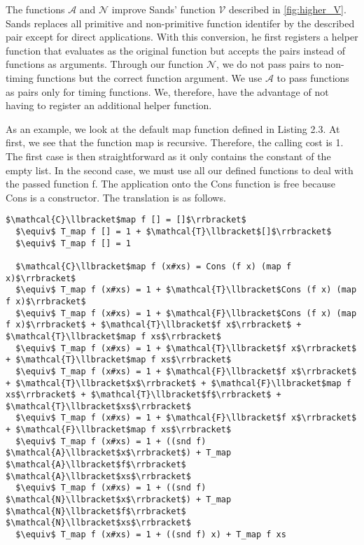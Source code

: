 The functions $\mathcal{A}$ and $\mathcal{N}$ improve Sands' function $\mathcal{V}$ described in \autoref{fig:higher_V}.
Sands replaces all primitive and non-primitive function identifer by the described pair except for direct applications.
With this conversion, he first registers a helper function that evaluates as the original function but accepts the pairs instead of functions as arguments.
Through our function $\mathcal{N}$, we do not pass pairs to non-timing functions but the correct function argument.
We use $\mathcal{A}$ to pass functions as pairs only for timing functions.
We, therefore, have the advantage of not having to register an additional helper function.

As an example, we look at the default map function defined in Listing 2.3. At first, we see that the function map is recursive.
Therefore, the calling cost is 1.
The first case is then straightforward as it only contains the constant of the empty list.
In the second case, we must use all our defined functions to deal with the passed function f.
The application onto the Cons function is free because Cons is a constructor.
The translation is as follows.
\begin{lstlisting}[mathescape=true,language=translation]
  $\mathcal{C}\llbracket$map f [] = []$\rrbracket$
  $\equiv$ T_map f [] = 1 + $\mathcal{T}\llbracket$[]$\rrbracket$
  $\equiv$ T_map f [] = 1

  $\mathcal{C}\llbracket$map f (x#xs) = Cons (f x) (map f x)$\rrbracket$
  $\equiv$ T_map f (x#xs) = 1 + $\mathcal{T}\llbracket$Cons (f x) (map f x)$\rrbracket$
  $\equiv$ T_map f (x#xs) = 1 + $\mathcal{F}\llbracket$Cons (f x) (map f x)$\rrbracket$ + $\mathcal{T}\llbracket$f x$\rrbracket$ + $\mathcal{T}\llbracket$map f xs$\rrbracket$
  $\equiv$ T_map f (x#xs) = 1 + $\mathcal{T}\llbracket$f x$\rrbracket$ + $\mathcal{T}\llbracket$map f xs$\rrbracket$
  $\equiv$ T_map f (x#xs) = 1 + $\mathcal{F}\llbracket$f x$\rrbracket$ + $\mathcal{T}\llbracket$x$\rrbracket$ + $\mathcal{F}\llbracket$map f xs$\rrbracket$ + $\mathcal{T}\llbracket$f$\rrbracket$ + $\mathcal{T}\llbracket$xs$\rrbracket$
  $\equiv$ T_map f (x#xs) = 1 + $\mathcal{F}\llbracket$f x$\rrbracket$ + $\mathcal{F}\llbracket$map f xs$\rrbracket$
  $\equiv$ T_map f (x#xs) = 1 + ((snd f) $\mathcal{A}\llbracket$x$\rrbracket$) + T_map $\mathcal{A}\llbracket$f$\rrbracket$ $\mathcal{A}\llbracket$xs$\rrbracket$
  $\equiv$ T_map f (x#xs) = 1 + ((snd f) $\mathcal{N}\llbracket$x$\rrbracket$) + T_map $\mathcal{N}\llbracket$f$\rrbracket$ $\mathcal{N}\llbracket$xs$\rrbracket$
  $\equiv$ T_map f (x#xs) = 1 + ((snd f) x) + T_map f xs
\end{lstlisting}

